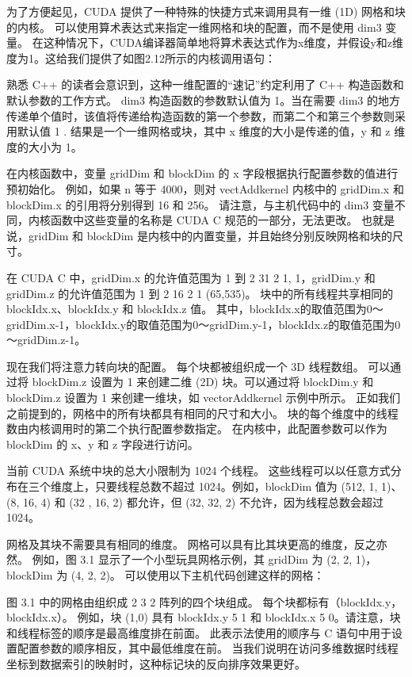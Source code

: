 为了方便起见，CUDA 提供了一种特殊的快捷方式来调用具有一维 (1D) 网格和块的内核。 可以使用算术表达式来指定一维网格和块的配置，而不是使用 dim3 变量。 在这种情况下，CUDA编译器简单地将算术表达式作为x维度，并假设y和z维度为1。这给我们提供了如图2.12所示的内核调用语句：

熟悉 C++ 的读者会意识到，这种一维配置的“速记”约定利用了 C++ 构造函数和默认参数的工作方式。 dim3 构造函数的参数默认值为 1。当在需要 dim3 的地方传递单个值时，该值将传递给构造函数的第一个参数，而第二个和第三个参数则采用默认值 1 . 结果是一个一维网格或块，其中 x 维度的大小是传递的值，y 和 z 维度的大小为 1。

在内核函数中，变量 gridDim 和 blockDim 的 x 字段根据执行配置参数的值进行预初始化。 例如，如果 n 等于 4000，则对 vectAddkernel 内核中的 gridDim.x 和 blockDim.x 的引用将分别得到 16 和 256。 请注意，与主机代码中的 dim3 变量不同，内核函数中这些变量的名称是 CUDA C 规范的一部分，无法更改。 也就是说，gridDim 和 blockDim 是内核中的内置变量，并且始终分别反映网格和块的尺寸。

在 CUDA C 中，gridDim.x 的允许值范围为 1 到 2 31 2 1, 1，gridDim.y 和 gridDim.z 的允许值范围为 1 到 2 16 2 1 (65,535)。 块中的所有线程共享相同的 blockIdx.x、blockIdx.y 和 blockIdx.z 值。 其中，blockIdx.x的取值范围为0～gridDim.x-1，blockIdx.y的取值范围为0～gridDim.y-1，blockIdx.z的取值范围为0～gridDim.z-1。

现在我们将注意力转向块的配置。 每个块都被组织成一个 3D 线程数组。 可以通过将 blockDim.z 设置为 1 来创建二维 (2D) 块。可以通过将 blockDim.y 和 blockDim.z 设置为 1 来创建一维块，如 vectorAddkernel 示例中所示。 正如我们之前提到的，网格中的所有块都具有相同的尺寸和大小。 块的每个维度中的线程数由内核调用时的第二个执行配置参数指定。 在内核中，此配置参数可以作为 blockDim 的 x、y 和 z 字段进行访问。

当前 CUDA 系统中块的总大小限制为 1024 个线程。 这些线程可以以任意方式分布在三个维度上，只要线程总数不超过 1024。例如，blockDim 值为 (512, 1, 1)、(8, 16, 4) 和 (32 , 16, 2) 都允许，但 (32, 32, 2) 不允许，因为线程总数会超过 1024。

网格及其块不需要具有相同的维度。 网格可以具有比其块更高的维度，反之亦然。 例如，图 3.1 显示了一个小型玩具网格示例，其 gridDim 为 (2, 2, 1)，blockDim 为 (4, 2, 2)。 可以使用以下主机代码创建这样的网格：

图 3.1 中的网格由组织成 2 3 2 阵列的四个块组成。 每个块都标有（blockIdx.y，blockIdx.x）。 例如，块 (1,0) 具有 blockIdx.y 5 1 和 blockIdx.x 5 0。请注意，块和线程标签的顺序是最高维度排在前面。 此表示法使用的顺序与 C 语句中用于设置配置参数的顺序相反，其中最低维度在前。 当我们说明在访问多维数据时线程坐标到数据索引的映射时，这种标记块的反向排序效果更好。

